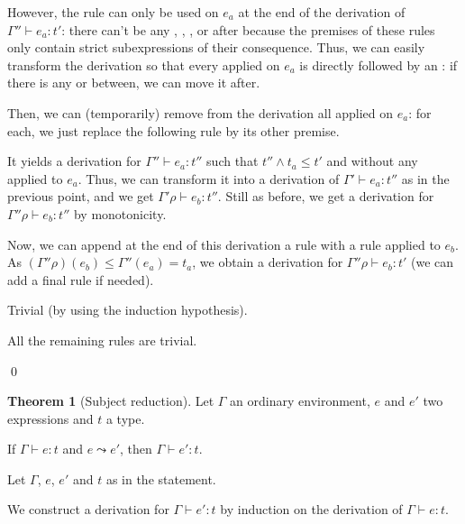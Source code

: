 \documentclass[a4paper]{article}
\theoremstyle{definition}
\newtheorem{theorem}{Theorem}
\begin{document}
\begin{description}
\begin{itemize}
            However, the rule  can only be used on $e_a$ at the end of the derivation of $\Gamma''\vdash e_a:t'$:
            there can't be any , , ,  or  after because the premises of these rules only contain strict subexpressions of their
            consequence.
            Thus, we can easily transform the derivation so that every  applied on $e_a$ is directly followed by an :
            if there is any  or  between, we can move it after.

            Then, we can (temporarily) remove from the derivation all  applied on $e_a$:
            for each, we just replace the following  rule by its other premise.

            It yields a derivation for $\Gamma'' \vdash e_a : t''$ such that $t''\land t_a \leq t'$ and without any  applied to $e_a$.
            Thus, we can transform it into a derivation of $\Gamma' \vdash e_a : t''$ as in the previous point, and we get $\Gamma'\rho \vdash e_b : t''$.
            Still as before, we get a derivation for $\Gamma''\rho\vdash e_b : t''$ by monotonicity.
            
            Now, we can append at the end of this derivation a rule  with a rule  applied to $e_b$.
            As $(\Gamma''\rho)(e_b) \leq \Gamma''(e_a) = t_a$, we obtain a derivation for $\Gamma''\rho\vdash e_b : t'$ (we can add a final  rule if needed).
          \end{itemize}
          
          \item[\Rule{PTypeof}] Trivial (by using the induction hypothesis).
          \item[\Rule{P$\cdots$}] All the remaining rules are trivial.
        \end{description}
        \qed

        \begin{theorem}[Subject reduction]
          Let $\Gamma$ an ordinary environment, $e$ and $e'$ two expressions and $t$ a type.

          If $\Gamma\vdash e:t$ and $e\leadsto e'$, then $\Gamma\vdash e':t$.
        \end{theorem}

        Let $\Gamma$, $e$, $e'$ and $t$ as in the statement.

        We construct a derivation for $\Gamma \vdash e':t$ by induction on the derivation of $\Gamma \vdash e:t$.
\end{document}
